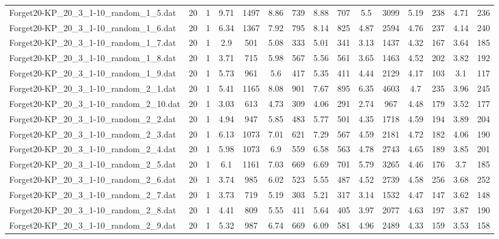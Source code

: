 \begin{table}[!ht]
{\begin{tabular}{lcccccccccccccc}
Forget20-KP\_20\_3\_1-10\_random\_1\_5.dat & 20 & 1 & 9.71 & 1497 & 8.86 & 739 & 8.88 & 707 & 5.5 & 3099 & 5.19 & 238 & 4.71 & 236 \\
Forget20-KP\_20\_3\_1-10\_random\_1\_6.dat & 20 & 1 & 6.34 & 1367 & 7.92 & 795 & 8.14 & 825 & 4.87 & 2594 & 4.76 & 237 & 4.14 & 240 \\
Forget20-KP\_20\_3\_1-10\_random\_1\_7.dat & 20 & 1 & 2.9 & 501 & 5.08 & 333 & 5.01 & 341 & 3.13 & 1437 & 4.32 & 167 & 3.64 & 185 \\
Forget20-KP\_20\_3\_1-10\_random\_1\_8.dat & 20 & 1 & 3.71 & 715 & 5.98 & 567 & 5.56 & 561 & 3.65 & 1463 & 4.52 & 202 & 3.82 & 192 \\
Forget20-KP\_20\_3\_1-10\_random\_1\_9.dat & 20 & 1 & 5.73 & 961 & 5.6 & 417 & 5.35 & 411 & 4.44 & 2129 & 4.17 & 103 & 3.1 & 117 \\
Forget20-KP\_20\_3\_1-10\_random\_2\_1.dat & 20 & 1 & 5.41 & 1165 & 8.08 & 901 & 7.67 & 895 & 6.35 & 4603 & 4.7 & 235 & 3.96 & 245 \\
Forget20-KP\_20\_3\_1-10\_random\_2\_10.dat & 20 & 1 & 3.03 & 613 & 4.73 & 309 & 4.06 & 291 & 2.74 & 967 & 4.48 & 179 & 3.52 & 177 \\
Forget20-KP\_20\_3\_1-10\_random\_2\_2.dat & 20 & 1 & 4.94 & 947 & 5.85 & 483 & 5.77 & 501 & 4.35 & 1718 & 4.59 & 194 & 3.89 & 204 \\
Forget20-KP\_20\_3\_1-10\_random\_2\_3.dat & 20 & 1 & 6.13 & 1073 & 7.01 & 621 & 7.29 & 567 & 4.59 & 2181 & 4.72 & 182 & 4.06 & 190 \\
Forget20-KP\_20\_3\_1-10\_random\_2\_4.dat & 20 & 1 & 5.98 & 1073 & 6.9 & 559 & 6.58 & 563 & 4.78 & 2743 & 4.65 & 189 & 3.85 & 201 \\
Forget20-KP\_20\_3\_1-10\_random\_2\_5.dat & 20 & 1 & 6.1 & 1161 & 7.03 & 669 & 6.69 & 701 & 5.79 & 3265 & 4.46 & 176 & 3.7 & 185 \\
Forget20-KP\_20\_3\_1-10\_random\_2\_6.dat & 20 & 1 & 3.74 & 985 & 6.02 & 523 & 5.55 & 487 & 4.52 & 2739 & 4.58 & 256 & 3.68 & 252 \\
Forget20-KP\_20\_3\_1-10\_random\_2\_7.dat & 20 & 1 & 3.73 & 719 & 5.19 & 303 & 5.21 & 317 & 3.14 & 1532 & 4.47 & 147 & 3.62 & 148 \\
Forget20-KP\_20\_3\_1-10\_random\_2\_8.dat & 20 & 1 & 4.41 & 809 & 5.55 & 411 & 5.64 & 405 & 3.97 & 2077 & 4.63 & 197 & 3.87 & 190 \\
Forget20-KP\_20\_3\_1-10\_random\_2\_9.dat & 20 & 1 & 5.32 & 987 & 6.74 & 669 & 6.09 & 581 & 4.96 & 2489 & 4.33 & 159 & 3.53 & 158 \\

\end{tabular}}
\end{table}
